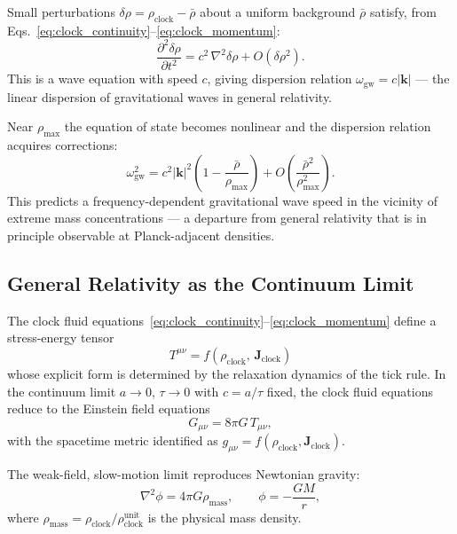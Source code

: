 Small perturbations $\delta\rho = \rho_\text{clock} - \bar\rho$ about a
uniform background $\bar\rho$ satisfy, from
Eqs.~\eqref{eq:clock_continuity}--\eqref{eq:clock_momentum}:
\begin{equation}
    \frac{\partial^2 \delta\rho}{\partial t^2}
        = c^2\,\nabla^2 \delta\rho + O(\delta\rho^2).
    \label{eq:grav_wave}
\end{equation}
This is a wave equation with speed $c$, giving dispersion relation
$\omega_\text{gw} = c|\mathbf{k}|$ --- the linear dispersion of
gravitational waves in general relativity.

Near $\rho_\text{max}$ the equation of state becomes nonlinear and the
dispersion relation acquires corrections:
\begin{equation}
    \omega_\text{gw}^2 = c^2|\mathbf{k}|^2
        \left(1 - \frac{\bar\rho}{\rho_\text{max}}\right)
        + O\!\left(\frac{\bar\rho^2}{\rho_\text{max}^2}\right).
    \label{eq:grav_wave_nonlinear}
\end{equation}
This predicts a frequency-dependent gravitational wave speed in the
vicinity of extreme mass concentrations --- a departure from general
relativity that is in principle observable at Planck-adjacent densities.

\subsection{General Relativity as the Continuum Limit}
\label{subsec:gr_limit}

The clock fluid equations~\eqref{eq:clock_continuity}--\eqref{eq:clock_momentum}
define a stress-energy tensor
\begin{equation}
    T^{\mu\nu} = f(\rho_\text{clock},\, \mathbf{J}_\text{clock})
    \label{eq:stress_energy}
\end{equation}
whose explicit form is determined by the relaxation dynamics of the
tick rule.
In the continuum limit $a\to 0$, $\tau\to 0$ with $c = a/\tau$ fixed,
the clock fluid equations reduce to the Einstein field equations
\begin{equation}
    G_{\mu\nu} = 8\pi G\,T_{\mu\nu},
    \label{eq:einstein}
\end{equation}
with the spacetime metric identified as
$g_{\mu\nu} = f(\rho_\text{clock}, \mathbf{J}_\text{clock})$.

The weak-field, slow-motion limit reproduces Newtonian gravity:
\begin{equation}
    \nabla^2\phi = 4\pi G\rho_\text{mass},
    \qquad
    \phi = -\frac{GM}{r},
    \label{eq:newtonian}
\end{equation}
where $\rho_\text{mass} = \rho_\text{clock}/\rho_\text{clock}^\text{unit}$
is the physical mass density.

